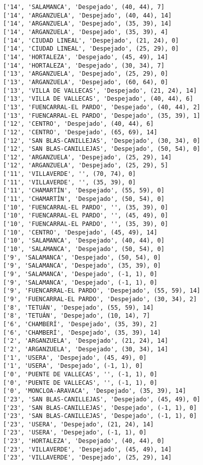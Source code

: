 \documentclass[11pt]{article}
\begin{document}
\begin{Verbatim}[commandchars=\\\{\}]
['14', 'SALAMANCA', 'Despejado', (40, 44), 7]
['14', 'ARGANZUELA', 'Despejado', (40, 44), 14]
['14', 'ARGANZUELA', 'Despejado', (35, 39), 14]
['14', 'ARGANZUELA', 'Despejado', (35, 39), 4]
['14', 'CIUDAD LINEAL', 'Despejado', (21, 24), 0]
['14', 'CIUDAD LINEAL', 'Despejado', (25, 29), 0]
['14', 'HORTALEZA', 'Despejado', (45, 49), 14]
['14', 'HORTALEZA', 'Despejado', (30, 34), 7]
['13', 'ARGANZUELA', 'Despejado', (25, 29), 0]
['13', 'ARGANZUELA', 'Despejado', (60, 64), 0]
['13', 'VILLA DE VALLECAS', 'Despejado', (21, 24), 14]
['13', 'VILLA DE VALLECAS', 'Despejado', (40, 44), 6]
['13', 'FUENCARRAL-EL PARDO', 'Despejado', (40, 44), 2]
['13', 'FUENCARRAL-EL PARDO', 'Despejado', (35, 39), 1]
['12', 'CENTRO', 'Despejado', (40, 44), 6]
['12', 'CENTRO', 'Despejado', (65, 69), 14]
['12', 'SAN BLAS-CANILLEJAS', 'Despejado', (30, 34), 0]
['12', 'SAN BLAS-CANILLEJAS', 'Despejado', (50, 54), 0]
['12', 'ARGANZUELA', 'Despejado', (25, 29), 14]
['12', 'ARGANZUELA', 'Despejado', (25, 29), 5]
['11', 'VILLAVERDE', '', (70, 74), 0]
['11', 'VILLAVERDE', '', (35, 39), 0]
['11', 'CHAMARTÍN', 'Despejado', (55, 59), 0]
['11', 'CHAMARTÍN', 'Despejado', (50, 54), 0]
['10', 'FUENCARRAL-EL PARDO', '', (35, 39), 0]
['10', 'FUENCARRAL-EL PARDO', '', (45, 49), 0]
['10', 'FUENCARRAL-EL PARDO', '', (35, 39), 0]
['10', 'CENTRO', 'Despejado', (45, 49), 14]
['10', 'SALAMANCA', 'Despejado', (40, 44), 0]
['10', 'SALAMANCA', 'Despejado', (50, 54), 0]
['9', 'SALAMANCA', 'Despejado', (50, 54), 0]
['9', 'SALAMANCA', 'Despejado', (35, 39), 0]
['9', 'SALAMANCA', 'Despejado', (-1, 1), 0]
['9', 'SALAMANCA', 'Despejado', (-1, 1), 0]
['9', 'FUENCARRAL-EL PARDO', 'Despejado', (55, 59), 14]
['9', 'FUENCARRAL-EL PARDO', 'Despejado', (30, 34), 2]
['8', 'TETUÁN', 'Despejado', (55, 59), 14]
['8', 'TETUÁN', 'Despejado', (10, 14), 7]
['6', 'CHAMBERÍ', 'Despejado', (35, 39), 2]
['6', 'CHAMBERÍ', 'Despejado', (35, 39), 14]
['2', 'ARGANZUELA', 'Despejado', (21, 24), 14]
['2', 'ARGANZUELA', 'Despejado', (30, 34), 14]
['1', 'USERA', 'Despejado', (45, 49), 0]
['1', 'USERA', 'Despejado', (-1, 1), 0]
['0', 'PUENTE DE VALLECAS', '', (-1, 1), 0]
['0', 'PUENTE DE VALLECAS', '', (-1, 1), 0]
['0', 'MONCLOA-ARAVACA', 'Despejado', (35, 39), 14]
['23', 'SAN BLAS-CANILLEJAS', 'Despejado', (45, 49), 0]
['23', 'SAN BLAS-CANILLEJAS', 'Despejado', (-1, 1), 0]
['23', 'SAN BLAS-CANILLEJAS', 'Despejado', (-1, 1), 0]
['23', 'USERA', 'Despejado', (21, 24), 14]
['23', 'USERA', 'Despejado', (-1, 1), 0]
['23', 'HORTALEZA', 'Despejado', (40, 44), 0]
['23', 'VILLAVERDE', 'Despejado', (45, 49), 14]
['23', 'VILLAVERDE', 'Despejado', (25, 29), 14]

\end{Verbatim}
\end{document}
